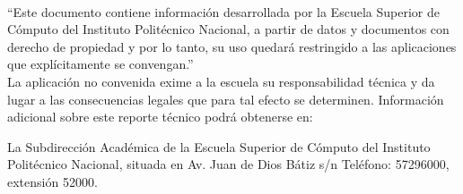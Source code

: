 




\ \\

\vspace*{\fill}

\begin{tcolorbox}[adjusted title=flush center,halign title=flush center,titlerule=3mm,title=\LARGE{ Advertencia}] 


``Este documento contiene información desarrollada por la Escuela
Superior de Cómputo del Instituto Politécnico Nacional, a partir de datos y
documentos con derecho de propiedad y por lo tanto, su uso quedará
restringido a las aplicaciones que explícitamente se convengan.''\\

La aplicación no convenida exime a la escuela su responsabilidad técnica y
da lugar a las consecuencias legales que para tal efecto se determinen. Información adicional sobre este reporte técnico podrá obtenerse en:

La Subdirección Académica de la Escuela Superior de Cómputo del Instituto
Politécnico Nacional, situada en Av. Juan de Dios Bátiz s/n Teléfono:
57296000, extensión 52000.

\end{tcolorbox}


\vspace*{\fill}
%
